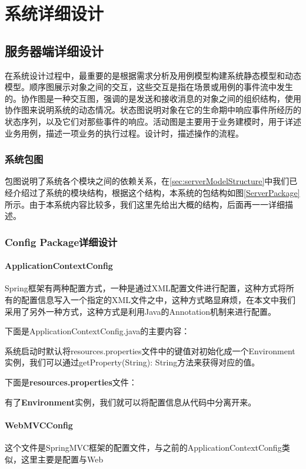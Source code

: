 
\chapter{系统详细设计}
\section{服务器端详细设计}
在系统设计过程中，最重要的是根据需求分析及用例模型构建系统静态模型和动态模型。顺序图展示对象之间的交互，这些交互是指在场景或用例的事件流中发生的。协作图是一种交互图，强调的是发送和接收消息的对象之间的组织结构，使用协作图来说明系统的动态情况。状态图说明对象在它的生命期中响应事件所经历的状态序列，以及它们对那些事件的响应。活动图是主要用于业务建模时，用于详述业务用例，描述一项业务的执行过程。设计时，描述操作的流程\cite{zhanghaipan1998}。

\subsection{系统包图}
包图说明了系统各个模块之间的依赖关系，在\ref{sec:serverModelStructure}中我们已经介绍过了系统的模块结构，根据这个结构，本系统的包结构如图\ref{ServerPackage}所示。由于本系统内容比较多，我们这里先给出大概的结构，后面再一一详细描述。

\subsection{Config Package详细设计}

\subsubsection{ApplicationContextConfig}
Spring框架有两种配置方式，一种是通过XML配置文件进行配置，这种方式将所有的配置信息写入一个指定的XML文件之中，这种方式略显麻烦，在本文中我们采用了另外一种方式，这种方式是利用Java的Annotation机制来进行配置。

下面是ApplicationContextConfig.java的主要内容：



系统启动时默认将resources.properties文件中的键值对初始化成一个Environment实例，我们可以通过getProperty(String): String方法来获得对应的值。

下面是\textbf{resources.properties}文件：



有了\textbf{Environment}实例，我们就可以将配置信息从代码中分离开来。

\subsubsection{WebMVCConfig}
这个文件是SpringMVC框架的配置文件，与之前的ApplicationContextConfig类似，这里主要是配置与Web